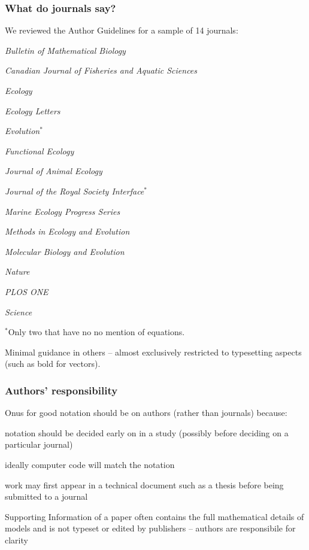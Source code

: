 
\begin{frame}
\frametitle{What do journals say?}
We reviewed the Author Guidelines for a sample of 14 journals:
\begin{multicols}{2}
\bi
\item \emph{Bulletin of Mathematical Biology}
\item \emph{Canadian Journal of Fisheries and Aquatic Sciences}
\item \emph{Ecology}
\item \emph{Ecology Letters}
\item \emph{Evolution$^*$}
\item \emph{Functional Ecology}
\item \emph{Journal of Animal Ecology}
\item \emph{Journal of the Royal Society Interface$^*$}
\item \emph{Marine Ecology Progress Series}
\item \emph{Methods in Ecology and Evolution}
\item \emph{Molecular Biology and Evolution}
\item \emph{Nature}
\item \emph{PLOS ONE}
\item \emph{Science}
\item[\vspace{\fill}]
\ei
\end{multicols}

$^*$Only two that have no no mention of equations.

Minimal guidance in others -- almost exclusively restricted to typesetting aspects
(such as bold for vectors).

\end{frame}

\begin{frame}
\frametitle{Authors' responsibility}
Onus for good notation should be on authors (rather than journals)
because:
\bi
  \item notation should be decided early on in a study (possibly before deciding on a
    particular journal)
  \item ideally computer code will match the notation
  \item  work may first appear in a technical document such as a thesis before being
      submitted to a journal
  \item Supporting Information of a paper often contains the full mathematical details of
models and is not typeset or edited by publishers -- authors are responsibile for
clarity
\ei
\end{frame}

